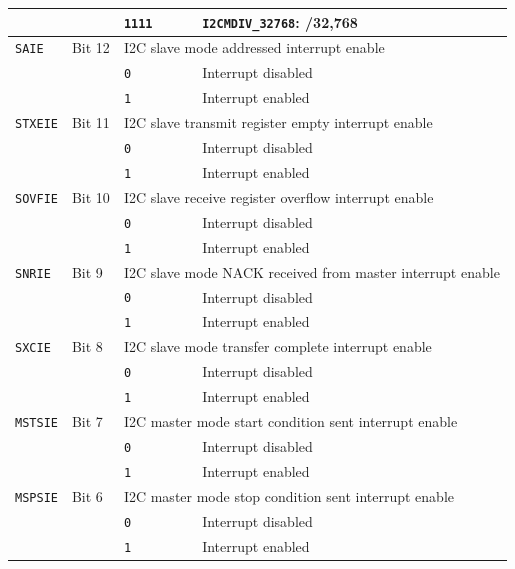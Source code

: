 \begin{tabularx}{\textwidth}{ l l l X }
 & & \cellcolor{tablehighlightcolor}\texttt{1111} & \cellcolor{tablehighlightcolor}\texttt{I2CMDIV\_32768}: /32,768 \\
\hline
\texttt{SAIE} & Bit 12 & \multicolumn{2}{X}{I2C slave mode addressed interrupt enable} \\
 & & \texttt{0} & Interrupt disabled \\
 & & \cellcolor{tablehighlightcolor}\texttt{1} & \cellcolor{tablehighlightcolor}Interrupt enabled \\
\hline
\texttt{STXEIE} & Bit 11 & \multicolumn{2}{X}{I2C slave transmit register empty interrupt enable} \\
 & & \texttt{0} & Interrupt disabled \\
 & & \cellcolor{tablehighlightcolor}\texttt{1} & \cellcolor{tablehighlightcolor}Interrupt enabled \\
\hline
\texttt{SOVFIE} & Bit 10 & \multicolumn{2}{X}{I2C slave receive register overflow interrupt enable} \\
 & & \texttt{0} & Interrupt disabled \\
 & & \cellcolor{tablehighlightcolor}\texttt{1} & \cellcolor{tablehighlightcolor}Interrupt enabled \\
\hline
\texttt{SNRIE} & Bit 9 & \multicolumn{2}{X}{I2C slave mode NACK received from master interrupt enable} \\
 & & \texttt{0} & Interrupt disabled \\
 & & \cellcolor{tablehighlightcolor}\texttt{1} & \cellcolor{tablehighlightcolor}Interrupt enabled \\
\hline
\texttt{SXCIE} & Bit 8 & \multicolumn{2}{X}{I2C slave mode transfer complete interrupt enable} \\
 & & \texttt{0} & Interrupt disabled \\
 & & \cellcolor{tablehighlightcolor}\texttt{1} & \cellcolor{tablehighlightcolor}Interrupt enabled \\
\hline
\texttt{MSTSIE} & Bit 7 & \multicolumn{2}{X}{I2C master mode start condition sent interrupt enable} \\
 & & \texttt{0} & Interrupt disabled \\
 & & \cellcolor{tablehighlightcolor}\texttt{1} & \cellcolor{tablehighlightcolor}Interrupt enabled \\
\hline
\texttt{MSPSIE} & Bit 6 & \multicolumn{2}{X}{I2C master mode stop condition sent interrupt enable} \\
 & & \texttt{0} & Interrupt disabled \\
 & & \cellcolor{tablehighlightcolor}\texttt{1} & \cellcolor{tablehighlightcolor}Interrupt enabled \\

\end{tabularx}
